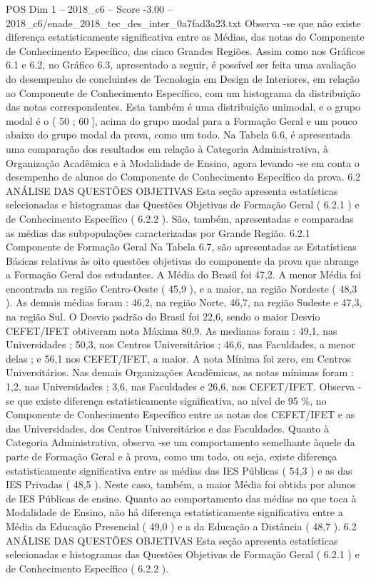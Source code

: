 \begin{textsample}{POS Dim 1 – 2018\_c6 – Score -3.00 – 2018\_c6/enade\_2018\_tec\_des\_inter\_0a7fad3a23.txt}
Observa -se que não existe diferença estatisticamente significativa entre as Médias, das notas do Componente de Conhecimento Específico, das cinco Grandes Regiões.
Assim como nos Gráficos 6.1 e 6.2, no Gráfico 6.3, apresentado a seguir, é possível ser feita uma avaliação do desempenho de concluintes de Tecnologia em Design de Interiores, em relação ao Componente de Conhecimento Específico, com um histograma da distribuição das notas correspondentes.
Esta também é uma distribuição unimodal, e o grupo modal é o ( 50 ; 60 ], acima do grupo modal para a Formação Geral e um pouco abaixo do grupo modal da prova, como um todo.
Na Tabela 6.6, é apresentada uma comparação dos resultados em relação à Categoria Administrativa, à Organização Acadêmica e à Modalidade de Ensino, agora levando -se em conta o desempenho de alunos do Componente de Conhecimento Específico da prova. 6.2 ANÁLISE DAS QUESTÕES OBJETIVAS Esta seção apresenta estatísticas selecionadas e histogramas das Questões Objetivas de Formação Geral ( 6.2.1 ) e de Conhecimento Específico ( 6.2.2 ).
São, também, apresentadas e comparadas as médias das subpopulações caracterizadas por Grande Região. 6.2.1 Componente de Formação Geral Na Tabela 6.7, são apresentadas as Estatísticas Básicas relativas às oito questões objetivas do componente da prova que abrange a Formação Geral dos estudantes.
A Média do Brasil foi 47,2.
A menor Média foi encontrada na região Centro-Oeste ( 45,9 ), e a maior, na região Nordeste ( 48,3 ).
As demais médias foram : 46,2, na região Norte, 46,7, na região Sudeste e 47,3, na região Sul.
O Desvio padrão do Brasil foi 22,6, sendo o maior Desvio CEFET/IFET obtiveram nota Máxima 80,9.
As medianas foram : 49,1, nas Universidades ; 50,3, nos Centros Universitários ; 46,6, nas Faculdades, a menor delas ; e 56,1 nos CEFET/IFET, a maior.
A nota Mínima foi zero, em Centros Universitários.
Nas demais Organizações Acadêmicas, as notas mínimas foram : 1,2, nas Universidades ; 3,6, nas Faculdades e 26,6, nos CEFET/IFET.
Observa -se que existe diferença estatisticamente significativa, ao nível de 95 \%, no Componente de Conhecimento Específico entre as notas dos CEFET/IFET e as das Universidades, dos Centros Universitários e das Faculdades.
Quanto à Categoria Administrativa, observa -se um comportamento semelhante àquele da parte de Formação Geral e à prova, como um todo, ou seja, existe diferença estatisticamente significativa entre as médias das IES Públicas ( 54,3 ) e as das IES Privadas ( 48,5 ).
Neste caso, também, a maior Média foi obtida por alunos de IES Públicas de ensino.
Quanto ao comportamento das médias no que toca à Modalidade de Ensino, não há diferença estatisticamente significativa entre a Média da Educação Presencial ( 49,0 ) e a da Educação a Distância ( 48,7 ). 6.2 ANÁLISE DAS QUESTÕES OBJETIVAS Esta seção apresenta estatísticas selecionadas e histogramas das Questões Objetivas de Formação Geral ( 6.2.1 ) e de Conhecimento Específico ( 6.2.2 ).

\end{textsample}

